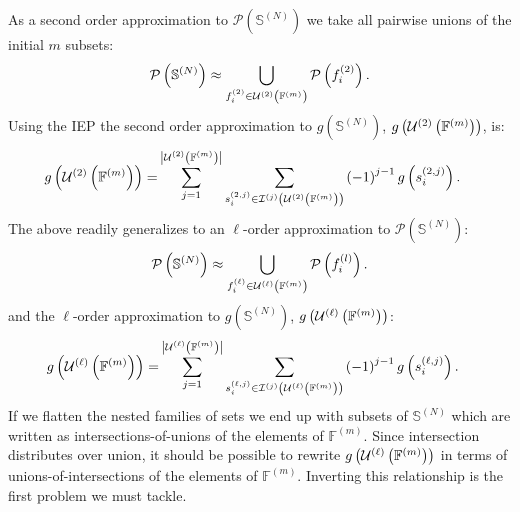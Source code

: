 \documentclass[11pt]{article}
\newcommand{\card}[1]{\left| #1\right|}
\newcommand{\gxn}[1]{g\left(#1\right)}
\newcommand{\pset}[1]{\mathcal{P}\left(#1\right)}
\newcommand{\ints}[2]{\mathcal{I}^{(#1)}\left(#2\right)}
\newcommand{\setf}{\mathbb{F}}
\newcommand{\fmem}[2]{f^{\left(#1\right)}_{#2}}
\newcommand{\smem}[2]{s^{\left(#1\right)}_{#2}}
\newcommand{\setfn}[1]{\setf^{(#1)}}
\newcommand{\sets}{\mathbb{S}^{(N)}}
\newcommand{\gapprox}[1]{g\left(#1\right)}
\begin{document}
As a second order approximation to $\pset{\sets}$ we take all pairwise unions
of the initial $m$ subsets:
\begin{align}
	\pset{\sets} \approx \bigcup_{\fmem{2}{i}\in\dimers}\pset{\fmem{2}{i}}.
\end{align}
Using the IEP the second order approximation to $\gxn{\sets}$,
$\gapprox{\dimers}$, is:
\begin{align}
	\gapprox{\dimers}=& \sum_{j=1}^{\card{\dimers}}
                        \sum_{\smem{2,j}{i}\in\ints{j}{\dimers}}
                          \left(-1\right)^{j-1}\gxn{\smem{2,j}{i}}.
\end{align}
The above readily generalizes to an $\ell$-order approximation to
$\pset{\sets}$:
\begin{align}
    \pset{\sets} \approx \bigcup_{\fmem{\ell}{i}\in\lmers}\pset{\fmem{l}{i}}.
\end{align}
and the $\ell$-order approximation to $\gxn{\sets}$, $\gapprox{\lmers}$:
\begin{align}
    \gapprox{\lmers}=& \sum_{j=1}^{\card{\lmers}}
                       \sum_{\smem{\ell,j}{i}\in\ints{j}{\lmers}}
                       \left(-1\right)^{j-1}\gxn{\smem{\ell,j}{i}}.
\end{align}
If we flatten the nested families of sets we end up with subsets of $\sets$
which are written as intersections-of-unions of the elements of $\setfn{m}$.
Since intersection distributes over union, it should be possible to rewrite
$\gapprox{\lmers}$ in terms of unions-of-intersections of the elements of
$\setfn{m}$. Inverting this relationship is the first problem we must tackle.

%
\end{document}
